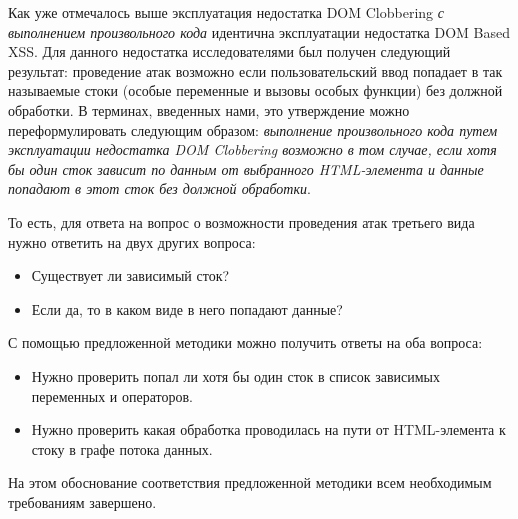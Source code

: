 \bigskip
Как уже отмечалось выше эксплуатация недостатка DOM Clobbering \textit{с выполнением произвольного кода} идентична эксплуатации недостатка DOM Based XSS. Для данного недостатка исследователями \cite{vogt} \cite{domwiki} был получен следующий результат: проведение атак возможно если пользовательский ввод попадает в так называемые стоки (особые переменные и вызовы особых функции) без должной обработки. В терминах, введенных нами, это утверждение можно переформулировать следующим образом: \textit{выполнение произвольного кода путем эксплуатации недостатка DOM Clobbering возможно в том случае, если хотя бы один сток зависит по данным от выбранного HTML-элемента и данные попадают в этот сток без должной обработки}.


То есть, для ответа на вопрос о возможности проведения атак третьего вида нужно ответить на двух других вопроса:
\begin{itemize}
	\item Существует ли зависимый сток?
	\item Если да, то в каком виде в него попадают данные?
\end{itemize}


С помощью предложенной методики можно получить ответы на оба вопроса:
\begin{itemize}
	\item Нужно проверить попал ли хотя бы один сток в список зависимых переменных и операторов.
	\item Нужно проверить какая обработка проводилась на пути от HTML-элемента к стоку в графе потока данных.
\end{itemize}
\bigskip

На этом обоснование соответствия предложенной методики всем необходимым требованиям завершено.

